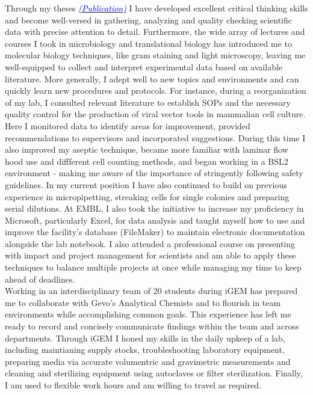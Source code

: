\documentclass[11pt,a4paper,sans]{moderncv}
\begin{document}
\begin{spacing}{1.15}
Through my theses {\href{https://www.ncbi.nlm.nih.gov/pubmed/29517395}{\textcolor{blue}{{\textit{(Publication)}}}}} I have developed excellent critical thinking skills and become well-versed in gathering, analyzing and quality checking scientific data with precise attention to detail. Furthermore, the wide array of lectures and courses I took in microbiology and translational biology has introduced me to molecular biology techniques, like gram staining and light microscopy, leaving me well-equipped to collect and interpret experimental data based on available literature. More generally, I adept well to new topics and environments and can quickly learn new procedures and protocols. For instance, during a reorganization of my  lab, I consulted relevant literature to establish SOPs and the necessary quality control for the production of viral vector tools in mammalian cell culture. Here I monitored data to identify areas for improvement, provided recommendations to supervisors and incorporated suggestions. During this time I also improved my aseptic technique, became more familiar with laminar flow hood use and diffferent cell counting methods, and began working in a BSL2 environment - making me aware of the importance of stringently following safety guidelines. In my current position I have also continued to build on previous experience in micropipetting, streaking cells for single colonies and preparing serial dilutions.  At EMBL, I also took the initiative to increase my proficiency in Microsoft, particularly Excel, for data analysis and taught myself how to use and improve the facility's database (FileMaker) to maintain electronic documentation alongside the lab notebook. I also attended a professional course on presenting with impact and project management for scientists and am able to apply these techniques to balance multiple projects at once while managing my time to keep ahead of deadlines.  \\%
 
Working in an interdisciplinary team of 20 students during iGEM has prepared me to collaborate with Gevo's Analytical Chemists and to flourish in team environments while accomplishing common goals. This experience has left me ready to record and concisely communicate findings within the team and across departments. Through iGEM I honed my skills in the daily upkeep of a lab, including maintianing supply stocks, troubleshooting laboratory equipment, preparing media via accurate volumentric and gravimetric measurements and cleaning and sterilizing equipment using autoclaves or filter sterilization. Finally, I am used to flexible work hours and am willing to travel as required. \par%


\end{spacing}
\end{document}
